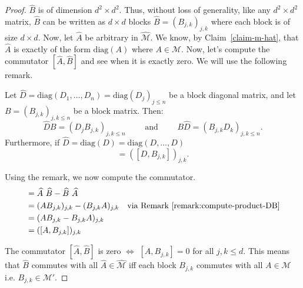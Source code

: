 \begin{proof}
    $\widehat{B}$ is of dimension $d^2 \times d^2$. Thus, without loss of generality, like any $d^2 \times d^2$ matrix, $\widehat{B}$ can be written as $d \times d$ blocks $\widehat{B} = (B_{j,k})_{j,k}$ where each block is of size $d \times d$. Now, let $\widehat{A}$ be arbitrary in $\widehat{\mathcal{M}}$. We know, by Claim~\ref{claim-m-hat}, that $\widehat{A}$ is exactly of the form $\text{diag}(A)$ where $A \in \mathcal{M}$. Now, let's compute the commutator $[\widehat{A}, \widehat{B}]$ and see when it is exactly zero. We will use the following remark.

    \begin{remark}\label{remark:compute-product-DB}
        Let $\widehat{D} = \text{diag}(D_1, \dots, D_n) = \text{diag}(D_j)_{j \leq n}$ be a block diagonal matrix, and let $B = \left(B_{j,k}\right)_{j,k \leq n}$ be a block matrix. Then:
        \begin{equation}
            \widehat{D}B = \left(D_j B_{j,k}\right)_{j,k \leq n} \quad\quad \text{ and } \quad\quad B\widehat{D} = \left(B_{j,k}D_k \right)_{j,k \leq n}.
        \end{equation}
         Furthermore, if  $\widehat{D} = \text{diag}(D) = \text{diag}(D, \dots, D)$
         \begin{equation}
             [\widehat{D}, B] = \left([D, B_{j,k}]\right)_{j,k}.
         \end{equation}
    \end{remark}
\noindent Using the remark, we now compute the commutator.
    \begin{align*}
        [\widehat{A}, \widehat{B}] &= \widehat{A} \ \widehat{B} - \widehat{B} \ \widehat{A}\\
        &= (A B_{j,k})_{j,k} - (B_{j,k} A)_{j,k} & \text{via Remark~\ref{remark:compute-product-DB}}\\
        &= (A B_{j,k} - B_{j,k} A)_{j,k}\\
        &= ([A, B_{j,k}])_{j,k}
    \end{align*}

\noindent The commutator $[\widehat{A}, \widehat{B}]$ is zero $\iff$ $[A, B_{j,k}] = 0$ for all $j, k \leq d$. This means that $\widehat{B}$ commutes with all $\widehat{A} \in \widehat{\mathcal{M}}$ iff each block $B_{j,k}$ commutes with all $A \in \mathcal{M}$ i.e. $B_{j,k} \in \mathcal{M}'$.
    

\end{proof}

